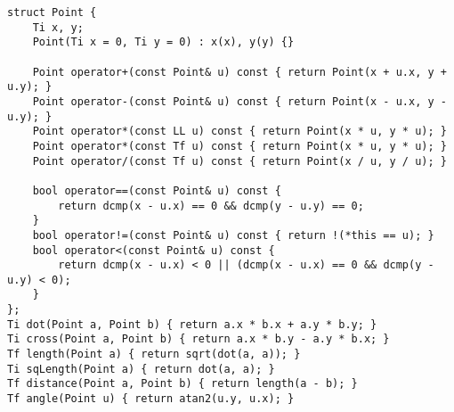 \documentclass[FSZ,a4paper,onesided]{article}
\begin{document}
\begin{multicols*}{\COLS}
\begin{lstlisting}
struct Point {
    Ti x, y;
    Point(Ti x = 0, Ti y = 0) : x(x), y(y) {}

    Point operator+(const Point& u) const { return Point(x + u.x, y + u.y); }
    Point operator-(const Point& u) const { return Point(x - u.x, y - u.y); }
    Point operator*(const LL u) const { return Point(x * u, y * u); }
    Point operator*(const Tf u) const { return Point(x * u, y * u); }
    Point operator/(const Tf u) const { return Point(x / u, y / u); }

    bool operator==(const Point& u) const {
        return dcmp(x - u.x) == 0 && dcmp(y - u.y) == 0;
    }
    bool operator!=(const Point& u) const { return !(*this == u); }
    bool operator<(const Point& u) const {
        return dcmp(x - u.x) < 0 || (dcmp(x - u.x) == 0 && dcmp(y - u.y) < 0);
    }
};
Ti dot(Point a, Point b) { return a.x * b.x + a.y * b.y; }
Ti cross(Point a, Point b) { return a.x * b.y - a.y * b.x; }
Tf length(Point a) { return sqrt(dot(a, a)); }
Ti sqLength(Point a) { return dot(a, a); }
Tf distance(Point a, Point b) { return length(a - b); }
Tf angle(Point u) { return atan2(u.y, u.x); }


\end{lstlisting}
\end{multicols*}
\end{document}
